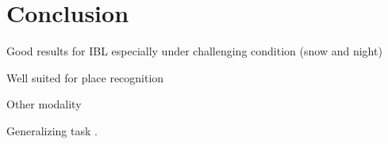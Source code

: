 \section{Conclusion}
\label{sec:conclusion}

Good results for IBL especially under challenging condition (snow and night)

Well suited for place recognition 

Other modality

Generalizing task \cite{Kendall2017}.